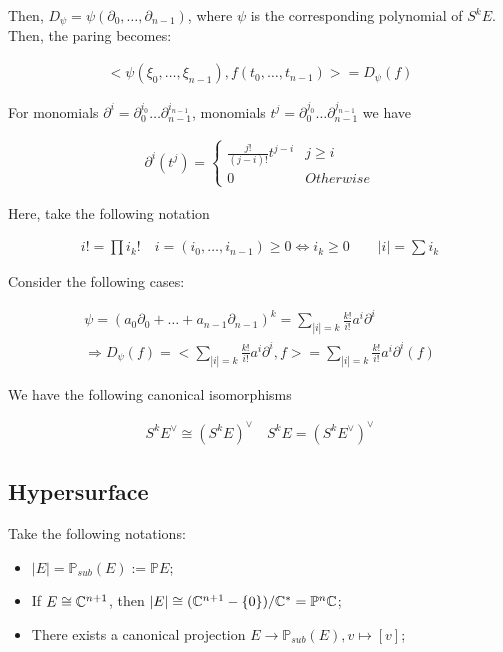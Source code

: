 \documentclass[Total.tex]{subfiles}
\begin{document}
		Then, $D_\psi=\psi(\partial_0,\dots,\partial_{n-1})$, where $\psi$ is the corresponding polynomial of $S^k E$. Then, the paring becomes:
		
		\begin{gather*}
			<\psi(\xi_0,\dots,\xi_{n-1}),f(t_0,\dots,t_{n-1})>=D_{\psi}(f)
		\end{gather*}
		
		For monomials $\partial^i=\partial_0^{i_0}\dots\partial_{n-1}^{i_{n-1}}$, monomials $t^j=\partial_0^{j_0}\dots\partial_{n-1}^{j_{n-1}}$ we have
		
		\begin{gather*}
			\partial^i(t^j)=\begin{cases}
				\frac{j!}{(j-i)!}t^{j-i}&j\geq i\\
				0&Otherwise
			\end{cases}
		\end{gather*}
		
		Here, take the following notation
		
		\begin{gather*}
			i!=\prod i_k!\quad i=(i_0,\dots,i_{n-1})\geq 0\Leftrightarrow i_k\geq 0\qquad |i|=\sum i_k
		\end{gather*}
		
		Consider the following cases:
		
		\begin{gather*}
			\psi=(a_0\partial_0+\dots+a_{n-1}\partial_{n-1})^k=\sum_{|i|=k} \frac{k!}{i!}a^i\partial^i\\
			\Rightarrow D_\psi(f)=<\sum_{|i|=k} \frac{k!}{i!}a^i\partial^i,f>=\sum_{|i|=k} \frac{k!}{i!}a^i\partial^i(f)
		\end{gather*}
		
		We have the following canonical isomorphisms
		
		\begin{gather*}
			S^k E^\vee\cong (S^k E)^\vee\quad S^kE=(S^k E^\vee)^\vee
		\end{gather*}
		
		
		\subsection{Hypersurface}
		
		Take the following notations:
		
		\begin{itemize}
			\item $|E|=\mathbb{P}_{sub}(E):=\mathbb{P} E$;
			\item If $E\cong \mathbb{C}^{n+1}$, then $|E|\cong (\mathbb{C}^{n+1}-\{0\})/\mathbb{C}^*=\mathbb{P}^n \mathbb{C}$;
			
			\item There exists a canonical projection $E\rightarrow \mathbb{P}_{sub}(E),v\mapsto [v]$;
		\end{itemize}
		
\end{document}
